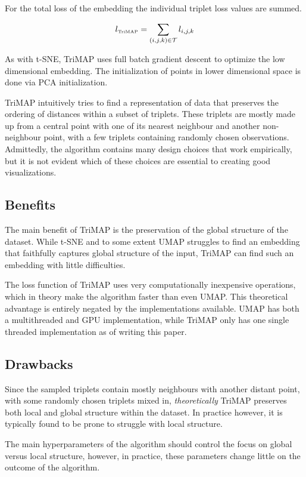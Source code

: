 For the total loss of the embedding the individual triplet loss values are summed.

\begin{equation}
	l_{\text{\tiny TriMAP}} = \sum_{(i,j,k)\in\mathcal{T}}l_{i,j,k}
\end{equation}

As with t-SNE, TriMAP uses full batch gradient descent to optimize the low dimensional embedding. The initialization of points in lower dimensional space is done via PCA initialization.

TriMAP intuitively tries to find a representation of data that preserves the ordering of distances within a subset of triplets. These triplets are mostly made up from a central point with one of its nearest neighbour and another non-neighbour point, with a few triplets containing randomly chosen observations. Admittedly, the algorithm contains many design choices that work empirically, but it is not evident which of these choices are essential to creating good visualizations.

\subsection{Benefits}

The main benefit of TriMAP is the preservation of the global structure of the dataset. While t-SNE and to some extent UMAP struggles to find an embedding that faithfully captures global structure of the input, TriMAP can find such an embedding with little difficulties.

The loss function of TriMAP uses very computationally inexpensive operations, which in theory make the algorithm faster than even UMAP. This theoretical advantage is entirely negated by the implementations available. UMAP has both a multithreaded and GPU implementation, while TriMAP only has one single threaded implementation as of writing this paper.

\subsection{Drawbacks}

Since the sampled triplets contain mostly neighbours with another distant point, with some randomly chosen triplets mixed in, \textit{theoretically} TriMAP preserves both local and global structure within the dataset. In practice however, it is typically found to be prone to struggle with local structure.

The main hyperparameters of the algorithm should control the focus on global versus local structure, however, in practice, these parameters change little on the outcome of the algorithm.

